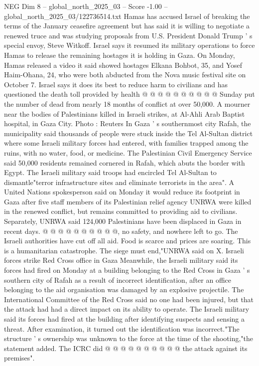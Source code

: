 \begin{textsample}{NEG Dim 8 – global\_north\_2025\_03 – Score -1.00 – global\_north\_2025\_03/122736514.txt}
Hamas has accused Israel of breaking the terms of the January ceasefire agreement but has said it is willing to negotiate a renewed truce and was studying proposals from U.S.
President Donald Trump ' s special envoy, Steve Witkoff.
Israel says it resumed its military operations to force Hamas to release the remaining hostages it is holding in Gaza.
On Monday, Hamas released a video it said showed hostages Elkana Bohbot, 35, and Yosef Haim-Ohana, 24, who were both abducted from the Nova music festival site on October 7.
Israel says it does its best to reduce harm to civilians and has questioned the death toll provided by health @ @ @ @ @ @ @ @ @ @ Sunday put the number of dead from nearly 18 months of conflict at over 50,000.
A mourner near the bodies of Palestinians killed in Israeli strikes, at Al-Ahli Arab Baptist hospital, in Gaza City.
Photo : Reuters In Gaza ' s southernmost city Rafah, the municipality said thousands of people were stuck inside the Tel Al-Sultan district where some Israeli military forces had entered, with families trapped among the ruins, with no water, food, or medicine.
The Palestinian Civil Emergency Service said 50,000 residents remained cornered in Rafah, which abuts the border with Egypt.
The Israeli military said troops had encircled Tel Al-Sultan to dismantle"terror infrastructure sites and eliminate terrorists in the area".
A United Nations spokesperson said on Monday it would reduce its footprint in Gaza after five staff members of its Palestinian relief agency UNRWA were killed in the renewed conflict, but remains committed to providing aid to civilians.
Separately, UNRWA said 124,000 Palestinians have been displaced in Gaza in recent days. @ @ @ @ @ @ @ @ @ @, no safety, and nowhere left to go.
The Israeli authorities have cut off all aid.
Food is scarce and prices are soaring.
This is a humanitarian catastrophe.
The siege must end,"UNRWA said on X.
Israeli forces strike Red Cross office in Gaza Meanwhile, the Israeli military said its forces had fired on Monday at a building belonging to the Red Cross in Gaza ' s southern city of Rafah as a result of incorrect identification, after an office belonging to the aid organisation was damaged by an explosive projectile.
The International Committee of the Red Cross said no one had been injured, but that the attack had had a direct impact on its ability to operate.
The Israeli military said its forces had fired at the building after identifying suspects and sensing a threat.
After examination, it turned out the identification was incorrect."The structure ' s ownership was unknown to the force at the time of the shooting,"the statement added.
The ICRC did @ @ @ @ @ @ @ @ @ @ the attack against its premises".

\end{textsample}
